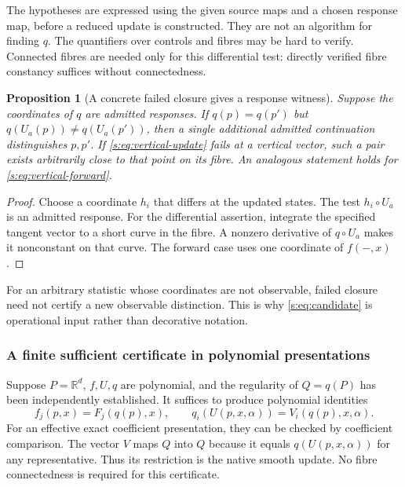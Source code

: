 \documentclass[11pt]{article}
\newtheorem{proposition}[theorem]{Proposition}
\theoremstyle{definition}
\theoremstyle{remark}\newtheorem{remark}[theorem]{Remark}
\newcommand{\R}{\mathbb R}
\begin{document}
The hypotheses are expressed using the given source maps and a chosen
response map, before a reduced update is constructed. They are not an
algorithm for finding $q$. The quantifiers over controls and fibres may be
hard to verify. Connected fibres are needed only for this differential
test: directly verified fibre constancy suffices without connectedness.

\begin{proposition}[A concrete failed closure gives a response witness]
\label{s:prop:witness}
Suppose the coordinates of $q$ are admitted responses. If $q(p)=q(p')$ but
$q(U_a(p))\ne q(U_a(p'))$, then a single additional admitted continuation
distinguishes $p,p'$. If \eqref{s:eq:vertical-update} fails at a vertical
vector, such a pair exists arbitrarily close to that point on its fibre.
An analogous statement holds for \eqref{s:eq:vertical-forward}.
\end{proposition}
\begin{proof}
Choose a coordinate $h_i$ that differs at the updated states. The test
$h_i\circ U_a$ is an admitted response. For the differential assertion,
integrate the specified tangent vector to a short curve in the fibre.
A nonzero derivative of $q\circ U_a$ makes it nonconstant on that curve.
The forward case uses one coordinate of $f(-,x)$.
\end{proof}
For an arbitrary statistic whose coordinates are not observable, failed
closure need not certify a new observable distinction. This is why
\eqref{s:eq:candidate} is operational input rather than decorative notation.

\subsubsection{A finite sufficient certificate in polynomial presentations}
Suppose $P=\R^d$, $f,U,q$ are polynomial, and the regularity of $Q=q(P)$
has been independently established. It suffices to produce polynomial
identities
\begin{equation}\label{s:eq:poly-cert}
 f_j(p,x)=F_j(q(p),x),\qquad
 q_i(U(p,x,\alpha))=V_i(q(p),x,\alpha).
\end{equation}
For an effective exact coefficient presentation, they can be checked by
coefficient comparison. The vector $V$ maps
$Q$ into $Q$ because it equals $q(U(p,x,\alpha))$ for any representative.
Thus its restriction is the native smooth update. No fibre connectedness
is required for this certificate.
\end{document}
